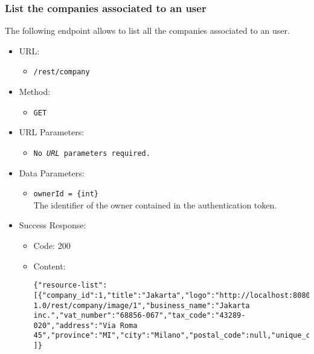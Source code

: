 \begin{itemize}
\end{itemize}


\newpage
\subsubsection*{List the companies associated to an user}

The following endpoint allows to list all the companies associated to an user.

\begin{itemize}
    
    \item URL: 
    \begin{itemize}
        \item \texttt{/rest/company}
    \end{itemize}
    
    \item Method: 
    \begin{itemize}
        \item \texttt{GET}
    \end{itemize}
    
    \item URL Parameters: 
    \begin{itemize}
        \item \texttt{No \textit{URL} parameters required.}
    \end{itemize}
    
    \item Data Parameters: 
    \begin{itemize}
        \item \texttt{ownerId = \{int\}} \\
        The identifier of the owner contained in the authentication token.
    \end{itemize}
    
    \item Success Response: 
    \begin{itemize}
        \item Code: 200
        \item Content:
        \begin{lstlisting}
{"resource-list":
[{"company_id":1,"title":"Jakarta","logo":"http://localhost:8080/bitsei-1.0/rest/company/image/1","business_name":"Jakarta inc.","vat_number":"68856-067","tax_code":"43289-020","address":"Via Roma 45","province":"MI","city":"Milano","postal_code":null,"unique_code":"1","has_mail_notifications":false,"has_telegram_notifications":false}
]}
        \end{lstlisting}    
    \end{itemize}
    

\end{itemize}
